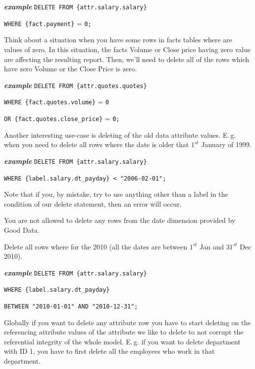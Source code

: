 \documentclass[a4paper, 12pt, titlepage, fleqn]{article}
\begin{document}
\textbf{\emph{example}}  \hspace{.9cm}\verb=DELETE FROM {attr.salary.salary}=

\hspace{2.5cm}\verb=WHERE {fact.payment}= = \verb=0;=

Think about a situation when you have some rows in facts tables where are values of zero. In this situation, the facts Volume or Close price having zero value are affecting the resulting report. Then, we'll need to delete all of the rows which have zero Volume or the Close Price is zero. 

\textbf{\emph{example}}  \hspace{.9cm}\verb=DELETE FROM {attr.quotes.quotes}=

\hspace{2.5cm}\verb=WHERE {fact.quotes.volume}= = \verb=0=

\hspace{2.5cm}\verb=OR {fact.quotes.close_price}= = \verb=0;=

\noindent Another interesting use-case is deleting of the old data attribute values. E.\,g. when you need to delete all rows where the date is older that $1^{st}$ January of 1999. 

\textbf{\emph{example}}  \hspace{.9cm}\verb=DELETE FROM {attr.salary.salary}=

\hspace{2.5cm}\verb=WHERE {label.salary.dt_payday} < "2006-02-01";=

Note that if you, by mistake, try to use anything other than a label in the condition of our delete statement, then an error will occur.

You are not allowed to delete any rows from the date dimension provided by Good Data. 

\noindent Delete all rows where for the 2010 (all the dates are between $1^{st}$ Jan and $31^{st}$ Dec 2010).

\textbf{\emph{example}}  \hspace{.9cm}\verb=DELETE FROM {attr.salary.salary}=

\hspace{2.5cm}\verb=WHERE {label.salary.dt_payday}=

\hspace{2.5cm}\verb=BETWEEN "2010-01-01" AND "2010-12-31";=

Globally if you want to delete any attribute row you have to start deleting on the referencing attribute values of the attribute we like to delete to not corrupt the referential integrity of the whole model. E.\,g. if you want to delete department with ID 1, you have to first delete all the employees who work in that department. 
\end{document}

